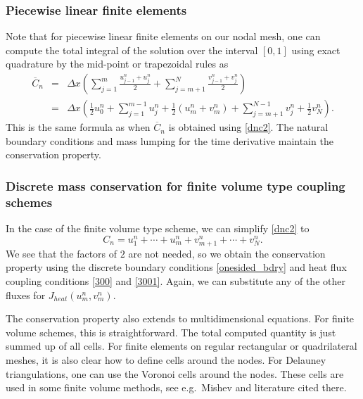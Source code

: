 %
%
\subsubsection*{Piecewise linear finite elements}
%
%

Note that for piecewise linear finite elements on our nodal mesh, one can compute the total integral
of the solution over the interval $[0,1]$ using exact quadrature by the mid-point or trapezoidal rules as
%
\begin{eqnarray*}
\overline{C}_n&=&\Delta x \left(\sum_{j=1}^m \frac{u_{j-1}^n+u_j^n}2 +\sum_{j=m+1}^N \frac{v_{j-1}^n+v_j^n}2\right)\\
&=&\Delta x \left(\frac 12 u_0^n + \sum_{j=1}^{m-1} u_j^n +\frac 12 (u_m^n +v_m^n) +\sum_{j=m+1}^{N-1} v_j^n
+\frac 12v_N^n\right).
\end{eqnarray*}
%
This is the same formula as when $\overline{C}_n$ is obtained using \eqref{dnc2}. The
natural boundary conditions and mass lumping for the time derivative maintain the conservation property.

%
%
\subsubsection*{Discrete mass conservation for finite volume type coupling schemes}
%
%

In the case of the finite volume type scheme, we can simplify \eqref{dnc2} to
%
\begin{equation}
    \label{fv_cons}
C_n=u^n_1+\cdots +u^n_m+v^n_{m+1}+\cdots+v^n_{N}. 
\end{equation}
%
We see that the factors of $2$ are not needed,
so we obtain the conservation property using the discrete boundary conditions \eqref{onesided_bdry}
and heat flux coupling conditions \eqref{300} and \eqref{3001}. Again, we can substitute
any of the other fluxes for $J_{heat}(u_m^n,v_m^n)$.

The conservation property also extends to multidimensional equations. For finite volume schemes, this is straightforward.
The total computed quantity is just summed up of all cells. 
For finite elements on regular rectangular or quadrilateral meshes,
it is also clear how to define cells around the nodes. 
For Delauney triangulations, one can use the Voronoi cells around the nodes.
These cells are used in some finite volume methods, see e.g.\ Mishev \cite{MIS} and literature cited there.


